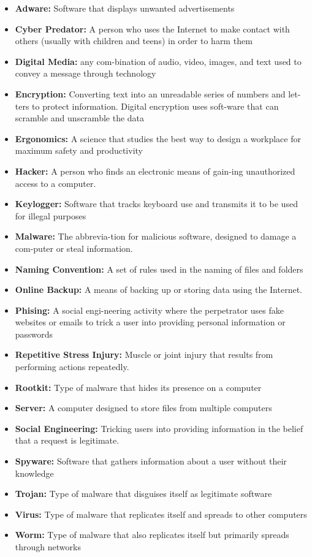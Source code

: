\documentclass{report}
\begin{document}
    \bigbreak \noindent 
    \begin{itemize}
        \item \textbf{Adware:} Software that displays unwanted advertisements 
        \item \textbf{Cyber Predator:} A person who uses the Internet to make contact with others (usually with children and teens) in order to harm them
        \item \textbf{Digital Media:} any com-bination of audio, video, images, and text used to convey a message through technology
        \item \textbf{Encryption:} Converting text into an unreadable series of numbers and let-ters to protect information. Digital encryption uses soft-ware that can scramble and unscramble the data
        \item \textbf{Ergonomics:} A science that studies the best way to design a workplace for maximum safety and productivity
        \item \textbf{Hacker:} A person who finds an electronic means of gain-ing unauthorized access to a computer.
        \item \textbf{Keylogger:} Software that tracks keyboard use and transmits it to be used for illegal purposes
        \item \textbf{Malware:} The abbrevia-tion for malicious software, designed to damage a com-puter or steal information.
        \item \textbf{Naming Convention:} A set of rules used in the naming of files and folders
        \item \textbf{Online Backup:} A means of backing up or storing data using the Internet.
        \item \textbf{Phising:} A social engi-neering activity where the perpetrator uses fake websites or emails to trick a user into providing personal information or passwords
        \item \textbf{Repetitive Stress Injury:} Muscle or joint injury that results from performing actions repeatedly.
        \item \textbf{Rootkit:} Type of malware that hides its presence on a computer
        \item \textbf{Server:} A computer designed to store files from multiple computers
        \item \textbf{Social Engineering:} Tricking users into providing information in the belief that a request is legitimate.
        \item \textbf{Spyware:} Software that gathers information about a user without their knowledge
        \item \textbf{Trojan:} Type of malware that disguises itself as legitimate software
        \item \textbf{Virus:} Type of malware that replicates itself and spreads to other computers
        \item \textbf{Worm:} Type of malware that also replicates itself but primarily spreads through networks
    \end{itemize}
\end{document}
